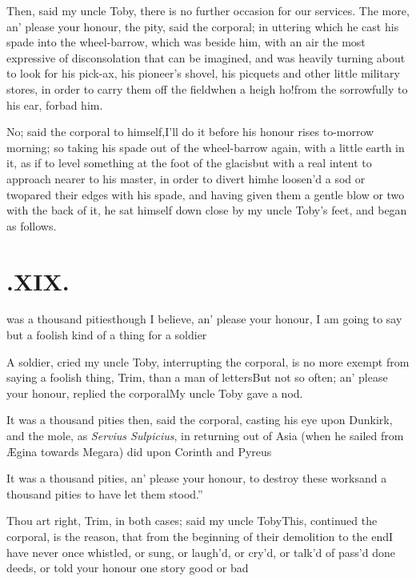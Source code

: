 \documentclass{article}
\begin{document}
\tsk Then, said my uncle Toby, there is no
further occasion for our services. The more, an’ please your
honour, the pity, said the corporal; in uttering which he cast his
spade into the wheel-barrow, which was beside him, with an air the
most expressive of disconsolation that can be imagined, and was
heavily turning about to look for his pick-ax, his pio\-neer’s
shovel, his picquets and other little military stores, in order to
carry them off the field\tsh when a heigh ho!\@ from the
sorrowfully to his ear, forbad him.

\tsk No; said the corporal to himself,\break I’ll do it
before his honour rises to-mor\-row morning; so taking his spade out
of the wheel-barrow again, with a little earth in it, as if to
level something at the foot of the glacis\tsh but with a
real intent to approach nearer to his master, in order to divert
him\tsh he loosen’d a sod or two\tsh pared
their edges with his spade, and having given them a gentle blow or
two with the back of it, he sat himself down close by my uncle
Toby’s feet, and began as follows.

\vfill{}\eject\null\smallskip
\section{.\enspace XIX.}

 was a thousand
pities\tsh though I believe, an’ please your honour,
I am going to say but a foolish kind of a thing for a
soldier\tsh

A soldier, cried my uncle Toby, interrupting the
corporal, is no more exempt from saying a foolish thing, Trim, than a man
of letters\tsh But not so often; an’ please your
honour, replied the corporal\tsh My uncle Toby gave
a nod.

It was a thousand pities then, said the corporal, casting his
eye upon Dunkirk, and the mole, as \textit{Servius Sulpicius},
in returning out of Asia (when he sailed from
Ægina towards Megara) did upon Co\-rinth
and Pyreus\tsh

\tsk \lqq It was a thousand pities, an’ please
your honour, to destroy these works\tsk\break and a thousand
pities to have let them stood.”\tsh

\tsh Thou art right, Trim, in both cases; said
my uncle Toby\tsh This, continued the corporal, is
the reason, that from the beginning of their demolition to the
end\tsh I have never once whistled, or sung, or
laugh’d, or cry’d, or talk’d of pass'd done deeds,
or told your honour one story good or bad\tsh
\end{document}
